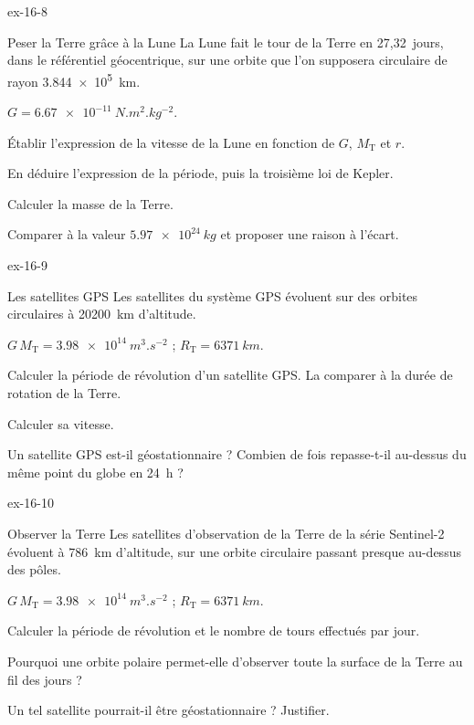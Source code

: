 \begin{blocLivre}{ex-16-8}
\begin{exercice}[2]{Peser la Terre grâce à la Lune}
La Lune fait le tour de la Terre en 27,32~jours, dans le référentiel géocentrique, sur une orbite que l'on supposera
circulaire de rayon \qty{3,844e5}{km}.
\begin{donnees}
$G=\qty{6,67e-11}{N.m^2.kg^{-2}}$.
\end{donnees}
\begin{questions}
\item Établir l'expression de la vitesse de la Lune en fonction de $G$, $M_\mathrm{T}$ et $r$.
\item En déduire l'expression de la période, puis la troisième loi de Kepler.
\item Calculer la masse de la Terre.
\item Comparer à la valeur $\qty{5,97e24}{kg}$ et proposer une raison à l'écart.
\end{questions}
\end{exercice}
\end{blocLivre}
\begin{blocLivre}{ex-16-9}
\begin{exercice}[2]{Les satellites GPS}
Les satellites du système GPS évoluent sur des orbites circulaires à \num{20200}~km d'altitude.
\begin{donnees}
$G\,M_\mathrm{T}=\qty{3,98e14}{m^3.s^{-2}}$ ; $R_\mathrm{T}=\qty{6371}{km}$.
\end{donnees}
\begin{questions}
\item Calculer la période de révolution d'un satellite GPS. La comparer à la durée de rotation de la Terre.
\item Calculer sa vitesse.
\item Un satellite GPS est-il géostationnaire ? Combien de fois repasse-t-il au-dessus du même point du globe en 24~h ?
\end{questions}
\end{exercice}
\end{blocLivre}
\begin{blocLivre}{ex-16-10}
\begin{exercice}[2]{Observer la Terre}
Les satellites d'observation de la Terre de la série Sentinel-2 évoluent à 786~km d'altitude, sur une orbite circulaire
passant presque au-dessus des pôles.
\begin{donnees}
$G\,M_\mathrm{T}=\qty{3,98e14}{m^3.s^{-2}}$ ; $R_\mathrm{T}=\qty{6371}{km}$.
\end{donnees}
\begin{questions}
\item Calculer la période de révolution et le nombre de tours effectués par jour.
\item Pourquoi une orbite polaire permet-elle d'observer toute la surface de la Terre au fil des jours ?
\item Un tel satellite pourrait-il être géostationnaire ? Justifier.
\end{questions}
\end{exercice}
\end{blocLivre}
